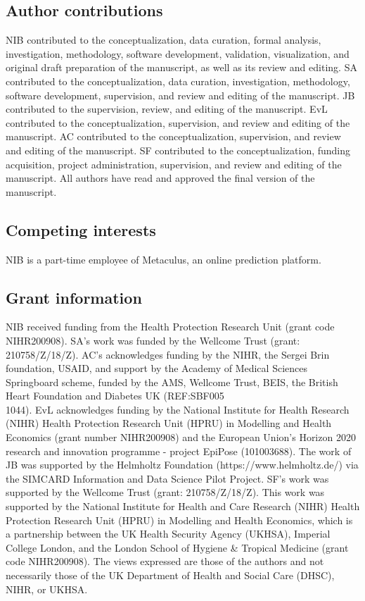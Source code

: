 \documentclass[10pt,a4paper,twocolumn]{article}
\begin{document}
\subsection*{Author contributions}
NIB contributed to the conceptualization, data curation, formal analysis, investigation, methodology, software development, validation, visualization, and original draft preparation of the manuscript, as well as its review and editing.
SA contributed to the conceptualization, data curation, investigation, methodology, software development, supervision, and review and editing of the manuscript.
JB contributed to the supervision, review, and editing of the manuscript.
EvL contributed to the conceptualization, supervision, and review and editing of the manuscript.
AC contributed to the conceptualization, supervision, and review and editing of the manuscript.
SF contributed to the conceptualization, funding acquisition, project administration, supervision, and review and editing of the manuscript.
All authors have read and approved the final version of the manuscript.

\subsection*{Competing interests}
NIB is a part-time employee of Metaculus, an online prediction platform. 

\subsection*{Grant information}
NIB received funding from the Health Protection Research Unit (grant code NIHR200908). SA's work was funded by the Wellcome Trust (grant: 210758/Z/18/Z). AC's acknowledges funding by the NIHR, the Sergei Brin foundation, USAID, and support by the Academy of Medical Sciences Springboard scheme, funded by the AMS, Wellcome Trust, BEIS, the British Heart Foundation and Diabetes UK (REF:SBF005\\1044). EvL acknowledges funding by the National Institute for Health Research (NIHR) Health Protection Research Unit (HPRU) in Modelling and Health Economics (grant number NIHR200908) and the European Union's Horizon 2020 research and innovation programme - project EpiPose (101003688). The work of JB was supported by the Helmholtz Foundation (https://www.helmholtz.de/) via the SIMCARD Information and Data Science Pilot Project. SF's work was supported by the Wellcome Trust (grant: 210758/Z/18/Z). This work was supported by the National Institute for Health and Care Research (NIHR) Health Protection Research Unit (HPRU) in Modelling and Health Economics, which is a partnership between the UK Health Security Agency (UKHSA), Imperial College London, and the London School of Hygiene \& Tropical Medicine (grant code NIHR200908). The views expressed are those of the authors and not necessarily those of the UK Department of Health and Social Care (DHSC), NIHR, or UKHSA.
\end{document}
